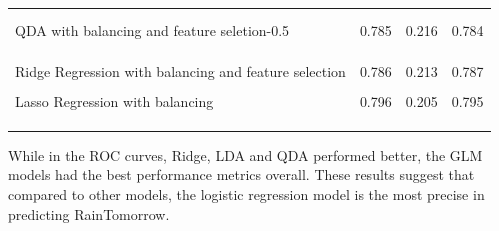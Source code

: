 \documentclass[
]{article}
\begin{document}
\begin{longtable}[l]{llll}
 &  &  \vphantom{3} & \\
\cellcolor{gray!15}{QDA with balancing and feature seletion-0.4} & \cellcolor{gray!15}{0.776} & \cellcolor{gray!15}{0.217} & \cellcolor{gray!15}{0.783}\\
QDA with balancing and feature seletion-0.5 & 0.785 & 0.216 & 0.784\\
\cellcolor{gray!15}{QDA with balancing and feature seletion-0.6} & \cellcolor{gray!15}{0.788} & \cellcolor{gray!15}{0.220} & \cellcolor{gray!15}{0.780}\\
 &  &  \vphantom{2} & \\
\cellcolor{gray!15}{Ridge Regression with balancing} & \cellcolor{gray!15}{0.786} & \cellcolor{gray!15}{0.213} & \cellcolor{gray!15}{0.787}\\
Ridge Regression with balancing and feature selection & 0.786 & 0.213 & 0.787\\
\cellcolor{gray!15}{} & \cellcolor{gray!15}{} & \cellcolor{gray!15}{ \vphantom{1}} & \cellcolor{gray!15}{}\\
Lasso Regression with balancing & 0.796 & 0.205 & 0.795\\
\cellcolor{gray!15}{Lasso Regression with balancing and feature selection} & \cellcolor{gray!15}{0.794} & \cellcolor{gray!15}{0.206} & \cellcolor{gray!15}{0.794}\\
 &  &  & \\
\cellcolor{gray!15}{KNN} & \cellcolor{gray!15}{0.782} & \cellcolor{gray!15}{0.216} & \cellcolor{gray!15}{0.784}\\*
\end{longtable}

While in the ROC curves, Ridge, LDA and QDA performed better, the GLM
models had the best performance metrics overall. These results suggest
that compared to other models, the logistic regression model is the most
precise in predicting RainTomorrow.
\end{document}
